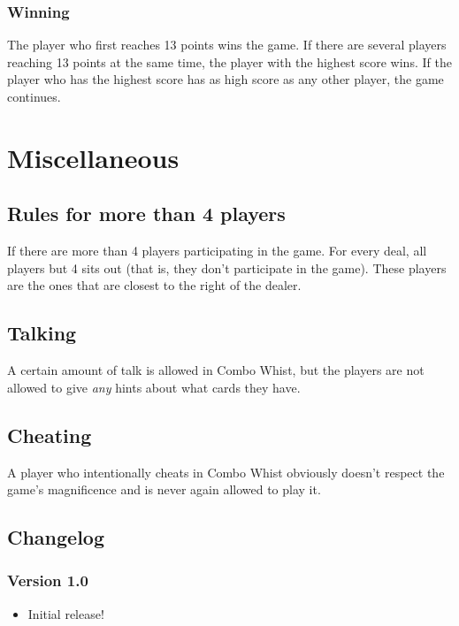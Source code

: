 \documentclass[a4paper, 11pt]{article}
\begin{document}
			\subsubsection{Winning}
			The player who first reaches 13 points wins the game. If there are several players reaching 13 points at the same time, the player with the highest score wins. If the player who has the highest score has as high score as any other player, the game continues.
			
	\section{Miscellaneous}
		\subsection{Rules for more than 4 players}
		If there are more than 4 players participating in the game. For every deal, all players but 4 sits out (that is, they don't participate in the game). These players are the ones that are closest to the right of the dealer.
		
		
		
		\subsection{Talking}
		A certain amount of talk is allowed in Combo Whist, but the players are not allowed to give \emph{any} hints about what cards they have.
		
		\subsection{Cheating}
		A player who intentionally cheats in Combo Whist obviously doesn't respect the game's magnificence and is never again allowed to play it.
		
		\subsection{Changelog}
			\subsubsection{Version 1.0}
			\begin{itemize}
				\item Initial release!
			\end{itemize}
\end{document}
